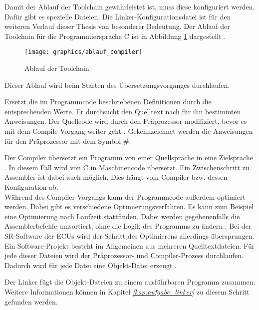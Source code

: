 Damit der Ablauf der Toolchain gewährleistet ist, muss diese konfiguriert werden.
Dafür gibt es spezielle Dateien.
Die Linker-Konfigurationsdatei ist für den weiteren Verlauf dieser Thesis von besonderer Bedeutung.
Der Ablauf der Toolchain für die Programmiersprache C ist in Abbildung \ref{fig:ablaufcompiler} dargestellt \cite{Küveler2013}.\\

\begin{figure}[H]
	\centering
	\texttt{[image: graphics/ablauf\_compiler]}
	\caption{Ablauf der Toolchain}
	\label{fig:ablaufcompiler}
\end{figure}

Dieser Ablauf wird beim Starten des Übersetzungsvorganges durchlaufen.
\begin{description}[style=nextline]
	\item[Präprozesssor] Ersetzt die im Programmcode beschriebenen Definitionen durch die entsprechenden Werte.
	Er durchsucht den Quelltext nach für ihn bestimmten Anweisungen.
	Der Quellcode wird durch den Präprozessor modifiziert, bevor es mit dem Compile-Vorgang weiter geht \cite{Klima2010-br}.
	Gekennzeichnet werden die Anweisungen für den Präprozessor mit dem Symbol \#.
	
	\item[Compiler] Der Compiler übersetzt ein Programm von einer Quellsprache in eine Zielsprache \cite{Watson2017}.
	In diesem Fall wird von C in Maschinencode übersetzt.
	Ein Zwischenschritt zu Assembler ist dabei auch möglich.
	Dies hängt vom Compiler bzw. dessen Konfiguration ab.\\
	Während des Compiler-Vorgangs kann der Programmcode außerdem optimiert werden.
	Dabei gibt es verschiedene Optimierungsverfahren.
	Es kann zum Beispiel eine Optimierung nach Laufzeit stattfinden.
	Dabei werden gegebenenfalls die Assemblerbefehle umsortiert, ohne die Logik des Programms zu ändern \cite{Klima2010-br}.
	Bei der \acs{SR}-Software der \acsp{ECU} wird der Schritt des Optimierens allerdings übersprungen.
	Ein Software-Projekt besteht im Allgemeinen aus mehreren Quelltextdateien.
	Für jede dieser Dateien wird der Präprozessor- und Compiler-Prozess durchlaufen.
	Dadurch wird für jede Datei eine Objekt-Datei erzeugt \cite{Klima2010-br}.
	
	\item[Linker] Der Linker fügt die Objekt-Dateien zu einem ausführbaren Programm zusammen.
	Weitere Informationen können in Kapitel \textit{\ref{kap:aufgabe_linker} } zu diesem Schritt gefunden werden.
\end{description}
